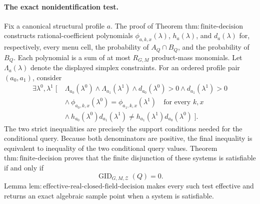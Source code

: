 \paragraph{The exact nonidentification test.}
Fix a canonical structural profile \(a\).  The proof of Theorem \(\mathrm{thm:finite\text{-}decision}\) constructs rational-coefficient polynomials \(\phi_{a,k,x}(\lambda)\), \(h_a(\lambda)\), and \(d_a(\lambda)\) for, respectively, every menu cell, the probability of \(A_Q\cap B_Q\), and the probability of \(B_Q\).  Each polynomial is a sum of at most \(R_{G,M}\) product-mass monomials.  Let \(\Lambda_a(\lambda)\) denote the displayed simplex constraints.  For an ordered profile pair \((a_0,a_1)\), consider
\[
 \begin{aligned}
 \exists\lambda^0,\lambda^1\;[\;&
 \Lambda_{a_0}(\lambda^0)\wedge\Lambda_{a_1}(\lambda^1)
 \wedge d_{a_0}(\lambda^0)>0
 \wedge d_{a_1}(\lambda^1)>0\\
 &\wedge\ \phi_{a_0,k,x}(\lambda^0)
       =\phi_{a_1,k,x}(\lambda^1)
       \quad\text{for every \(k,x\)}\\
 &\wedge\ h_{a_0}(\lambda^0)d_{a_1}(\lambda^1)
       \ne h_{a_1}(\lambda^1)d_{a_0}(\lambda^0)\;].
 \end{aligned}
\]
The two strict inequalities are precisely the support conditions needed for the conditional query.  Because both denominators are positive, the final inequality is equivalent to inequality of the two conditional query values.  Theorem \(\mathrm{thm:finite\text{-}decision}\) proves that the finite disjunction of these systems is satisfiable if and only if
\[
 \operatorname{GID}_{G,M,\mathcal Z}(Q)=0.
\]
Lemma \(\mathrm{lem:effective\text{-}real\text{-}closed\text{-}field\text{-}decision}\) makes every such test effective and returns an exact algebraic sample point when a system is satisfiable.

